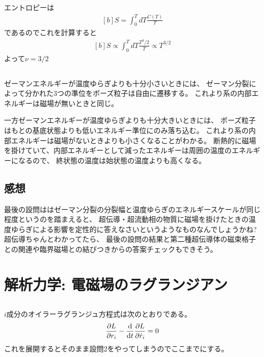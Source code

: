 \documentclass[../../master.tex]{subfiles}
\begin{document}
\subsection{}
エントロピーは
\begin{equation}\begin{aligned}[b]
    S = \int_{0}^{T}dT \frac{C(T)}{T}
\end{aligned}\end{equation}
であるのでこれを計算すると
\begin{equation}\begin{aligned}[b]
    S \propto \int_{0}^{T}dT\frac{T^3/2}{T} \propto T^{3/2}
\end{aligned}\end{equation}
よって\(\nu =3/2\)

\subsection{}
ゼーマンエネルギーが温度ゆらぎよりも十分小さいときには、
ゼーマン分裂によって分かれた3つの準位をボーズ粒子は自由に遷移する。
これより系の内部エネルギーは磁場が無いときと同じ。

一方ゼーマンエネルギーが温度ゆらぎよりも十分大きいときには、
ボーズ粒子はもとの基底状態よりも低いエネルギー準位にのみ落ち込む。
これより系の内部エネルギーは磁場がないときよりも小さくなることがわかる。
断熱的に磁場を掛けていて、内部エネルギーとして減ったエネルギーは周囲の温度のエネルギーになるので、
終状態の温度は始状態の温度よりも高くなる。


\subsection*{感想}
最後の設問ははゼーマン分裂の分裂幅と温度ゆらぎのエネルギースケールが同じ程度というのを踏まえると、
超伝導・超流動相の物質に磁場を掛けたときの温度ゆらぎによる影響を定性的に答えなさいというようなものなんでしょうかね?
超伝導ちゃんとわかってたら、
最後の設問の結果と第二種超伝導体の磁束格子との関連や臨界磁場との結びつきからの答案チェックもできそう。

\clearpage
\section{解析力学: 電磁場のラグランジアン}
\subsection{}
\(i\)成分のオイラーラグランジュ方程式は次のとおりである。
\begin{align*}
    \pdv{L}{r_i}-\dv{t}\pdv{L}{\dot{r}_i}=0
\end{align*}
これを展開するとそのまま設問2をやってしまうのでここまでにする。
\end{document}
